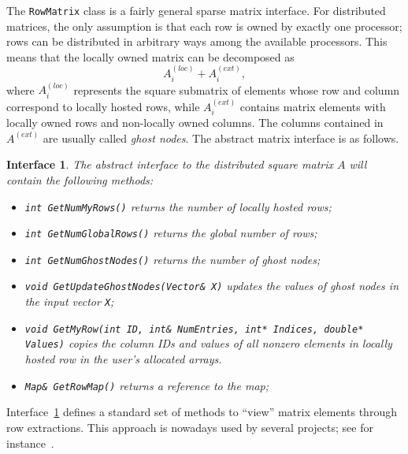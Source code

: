 \documentclass[acmtocl]{acmtrans2m}
\newtheorem{interface}{Interface}[section]
\begin{document}
The {\tt RowMatrix} class is a fairly general sparse matrix interface. For
distributed matrices, the only assumption is that each row is owned by exactly
one processor; rows can be distributed in arbitrary ways among the available
processors. This means that the locally owned matrix can be decomposed as
\begin{equation}
A^{(loc)}_i + A^{(ext)}_i,
\end{equation}
where $A^{(loc)}_i$ represents the square submatrix of elements whose row
and column correspond to locally hosted rows, while
$A^{(ext)}_i$ contains matrix elements with locally owned rows and
non-locally owned columns. The
columns contained in $A^{(ext)}$ are usually called {\sl ghost nodes}.
The abstract matrix interface is as
follows.
\begin{interface}
\label{int:ami}
The abstract interface to the distributed square matrix $A$
will contain the following methods:
\begin{itemize}
\item \verb!int GetNumMyRows()! returns the number of locally hosted rows;
\item \verb!int GetNumGlobalRows()! returns the global number of rows;
\item \verb!int GetNumGhostNodes()! returns the number of ghost nodes;
\item \verb!void GetUpdateGhostNodes(Vector& X)! updates the values of ghost nodes
 in the input vector {\tt X};
\item {\tt void GetMyRow(int ID, int\& NumEntries, int* Indices, double*
                             Values)} copies the
column IDs and values of all nonzero elements in locally hosted row 
in the user's allocated arrays.
\item \verb!Map& GetRowMap()! returns a reference to the map;
\end{itemize}
\end{interface}
Interface~\ref{int:ami} defines a standard set of methods to ``view'' matrix
elements through row extractions. This approach is nowadays used  by several
projects; see for instance~\cite{Epetra-Ref-Guide,ml-guide,lujan00oolala}.

\smallskip
\end{document}
